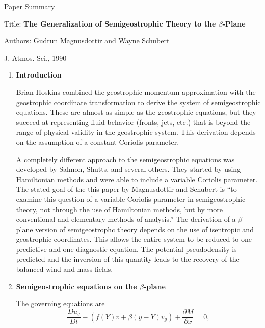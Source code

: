 \documentclass[11pt]{report}
\begin{document}
Paper Summary

Title: \textbf{The Generalization of Semigeostrophic Theory to the 
               $\beta$-Plane}

Authors: Gudrun Magnusdottir and Wayne Schubert

J. Atmos. Sci., 1990

\vspace{0.25in}

\begin{enumerate}
\item{\textbf{Introduction}}

Brian Hoskins combined the geostrophic momentum approximation with the
geostrophic coordinate transformation to derive the system of semigeostrophic
equations.  These are almost as simple as the geostrophic equations, but they
succeed at representing fluid behavior (fronts, jets, etc.) that is beyond the
range of physical validity in the geostrophic system.  This derivation depends on
the assumption of a constant Coriolis parameter.

A completely different approach to the semigeostrophic equations was developed
by Salmon, Shutts, and several others.  They started by using Hamiltonian
methods and were able to include a variable Coriolis parameter.  The stated goal
of the this paper by Magnusdottir and Schubert is ``to examine this question of a
variable Coriolis parameter in semigeostrophic theory, not through the use of
Hamiltonian methods, but by more conventional and elementary methods of
analysis.''  The derivation of a $\beta$-plane version of semigeostrophc theory
depends on the use of isentropic and geostrophic coordinates.  This allows the
entire system to be reduced to one predictive and one diagnostic equation.  The
potential pseudodensity is predicted and the inversion of this quantity leads to
the recovery of the balanced wind and mass fields.  
	
\item{\textbf{Semigeostrophic equations on the $\beta$-plane}}

The governing equations are 
\begin{equation}
    \frac{Du_g}{Dt}-(f(Y)v+\beta(y-Y)v_g)+\frac{\partial M}{\partial x}=0,
\end{equation}   


\end{enumerate}
\end{document}
